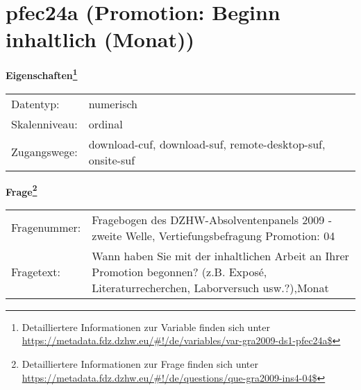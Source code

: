 
    \setcounter{footnote}{0}

    \vspace*{-1.8cm}
	\section{pfec24a (Promotion: Beginn inhaltlich (Monat))}
	\label{section:pfec24a}



    \vspace*{0.5cm}
    \noindent\textbf{Eigenschaften\footnote{Detailliertere Informationen zur Variable finden sich unter
		\url{https://metadata.fdz.dzhw.eu/\#!/de/variables/var-gra2009-ds1-pfec24a$}}}\\
	\begin{tabularx}{\hsize}{@{}lX}
	Datentyp: & numerisch \\
	Skalenniveau: & ordinal \\
	Zugangswege: &
	  download-cuf, 
	  download-suf, 
	  remote-desktop-suf, 
	  onsite-suf
 \\
    \end{tabularx}



				\vspace*{0.5cm}
                \noindent\textbf{Frage\footnote{Detailliertere Informationen zur Frage finden sich unter
		              \url{https://metadata.fdz.dzhw.eu/\#!/de/questions/que-gra2009-ins4-04$}}}\\
				\begin{tabularx}{\hsize}{@{}lX}
					Fragenummer: &
					  Fragebogen des DZHW-Absolventenpanels 2009 - zweite Welle, Vertiefungsbefragung Promotion:
					  04
 \\
					Fragetext: & Wann haben Sie mit der inhaltlichen Arbeit an Ihrer Promotion begonnen? (z.B. Exposé, Literaturrecherchen, Laborversuch usw.?),Monat \\
				\end{tabularx}





